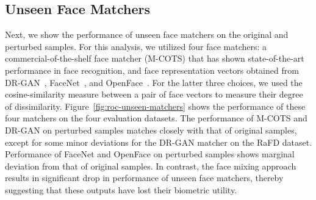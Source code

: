 \documentclass[10pt,twocolumn,letterpaper]{article}
\begin{document}









\subsection{Unseen Face Matchers}

Next, we show the performance of unseen face matchers on the original and perturbed samples. For this analysis, we utilized four face matchers: a commercial-of-the-shelf face matcher (M-COTS) that has shown state-of-the-art performance in face recognition, and  face representation vectors obtained from DR-GAN~\cite{tran_disentangled_2017},  FaceNet~\cite{schroff_facenet_2015}, and OpenFace~\cite{amos_openface_2016}. For the latter three choices, we used the cosine-similarity measure between a pair of face vectors to measure their degree of dissimilarity.
Figure~\ref{fig:roc-unseen-matchers} shows the performance of these four matchers on the four evaluation datasets. The performance of M-COTS and DR-GAN on perturbed samples matches closely with that of original samples, except for some minor deviations for the DR-GAN matcher on the RaFD dataset. Performance of FaceNet and OpenFace on perturbed samples shows marginal deviation from that of original samples. In contrast, the face mixing approach~\cite{othman_privacy_2014} results in significant drop in performance of unseen face matchers, thereby suggesting that these outputs have lost their biometric utility.
\end{document}
